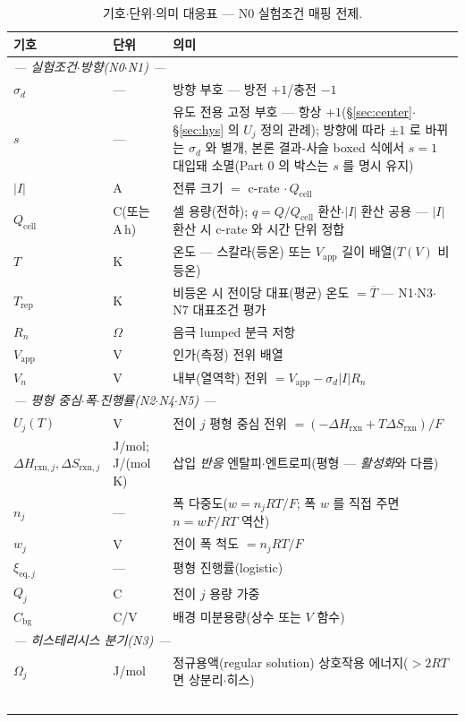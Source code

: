 \documentclass[11pt,a4paper]{article}
\newcommand{\eq}{\mathrm{eq}}
\newcommand{\app}{\mathrm{app}}
\newcommand{\cell}{\mathrm{cell}}
\newcommand{\bg}{\mathrm{bg}}
\newcommand{\rxn}{\mathrm{rxn}}
\newcommand{\rep}{\mathrm{rep}}
\begin{document}
\begin{longtable}{p{} p{} p{}}
\caption{기호$\cdot$단위$\cdot$의미 대응표 --- N0 실험조건 매핑 전제.}\label{tab:notation}\\
\toprule 기호 & 단위 & 의미 \\ \midrule \endhead
\multicolumn{3}{l}{\emph{— 실험조건$\cdot$방향(N0$\cdot$N1) —}}\\
$\sigma_d$ & --- & 방향 부호 — 방전 $+1$/충전 $-1$ \\
$s$ & --- & 유도 전용 고정 부호 — 항상 $+1$(\S\ref{sec:center}$\cdot$\S\ref{sec:hys} 의 $U_j$ 정의 관례); 방향에 따라 $\pm1$ 로 바뀌는 $\sigma_d$ 와 별개, 본론 결과-사슬 boxed 식에서 $s{=}1$ 대입돼 소멸(Part 0 의 박스는 $s$ 를 명시 유지) \\
$|I|$ & A & 전류 크기 $=$ c-rate$\,\cdot Q_\cell$ \\
$Q_\cell$ & C(또는 A\,h) & 셀 용량(전하); $q=Q/Q_\cell$ 환산$\cdot$$|I|$ 환산 공용 — $|I|$ 환산 시 c-rate 와 시간 단위 정합 \\
$T$ & K & 온도 — 스칼라(등온) 또는 $V_\app$ 길이 배열($T(V)$ 비등온) \\
$T_\rep$ & K & 비등온 시 전이당 대표(평균) 온도 $=\overline T$ — N1$\cdot$N3$\cdot$N7 대표조건 평가 \\
$R_n$ & $\Omega$ & 음극 lumped 분극 저항 \\
$V_\app$ & V & 인가(측정) 전위 배열 \\
$V_n$ & V & 내부(열역학) 전위 $=V_\app-\sigma_d|I|R_n$ \\
\multicolumn{3}{l}{\emph{— 평형 중심$\cdot$폭$\cdot$진행률(N2$\cdot$N4$\cdot$N5) —}}\\
$U_j(T)$ & V & 전이 $j$ 평형 중심 전위 $=(-\Delta H_\rxn+T\Delta S_\rxn)/F$ \\
$\Delta H_{\rxn,j},\Delta S_{\rxn,j}$ & {\footnotesize J/mol;\,J/(mol\,K)} & 삽입 \emph{반응} 엔탈피$\cdot$엔트로피(평형 — \emph{활성화}와 다름) \\
$n_j$ & --- & 폭 다중도($w=n_jRT/F$; 폭 $w$ 를 직접 주면 $n=wF/RT$ 역산) \\
$w_j$ & V & 전이 폭 척도 $=n_jRT/F$ \\
$\xi_{\eq,j}$ & --- & 평형 진행률(logistic) \\
$Q_j$ & C & 전이 $j$ 용량 가중 \\
$C_\bg$ & C/V & 배경 미분용량(상수 또는 $V$ 함수) \\
\multicolumn{3}{l}{\emph{— 히스테리시스 분기(N3) —}}\\
$\Omega_j$ & J/mol & 정규용액(regular solution) 상호작용 에너지($>2RT$ 면 상분리$\cdot$히스) \\
$$
\end{longtable}
\end{document}
